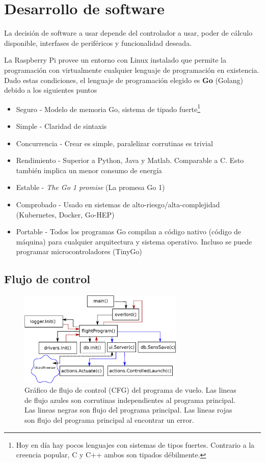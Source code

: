 \section{Desarrollo de software}

La decisión de software a usar depende del controlador a usar, poder de cálculo disponible, interfases de periféricos y funcionalidad deseada.

\medskip

La Raspberry Pi provee un entorno con Linux instalado que permite la programación con virtualmente cualquier lenguaje de programación en existencia. Dado estas condiciones, el lenguaje de programación elegido es \textbf{Go} (Golang) debido a los siguientes puntos

\begin{itemize}
    \item Seguro - Modelo de memoria Go, sistema de tipado fuerte\footnote{Hoy en día hay pocos lenguajes con sistemas de tipos fuertes. Contrario a la creencia popular, C y C++ ambos son tipados débilmente.}
    \item Simple - Claridad de sintaxis
    \item Concurrencia - Crear  es simple, paralelizar corrutinas es trivial
    \item Rendimiento - Superior a Python, Java y Matlab. Comparable a C. Esto también implica un menor consumo de energía
    \item Estable - \textit{The Go 1 promise} (La promesa Go 1)
    \item Comprobado -  Usado en sistemas de alto-riesgo/alta-complejidad (Kubernetes, Docker, Go-HEP)
    \item Portable - Todos los programas Go compilan a código nativo (código de máquina) para cualquier arquitectura y sistema operativo. Incluso se puede programar microcontroladores (TinyGo)
\end{itemize}


\newpage

\subsection{Flujo de control}
\begin{figure}[!htb]
    \centering
    \includegraphics[width=0.7\textwidth]{fig/cfg_flightprogram.eps}
    \caption{Gráfico de flujo de control (CFG) del programa de vuelo. Las lineas de flujo azules son corrutinas independientes al programa principal. Las lineas negras son flujo del programa principal. Las lineas rojas son flujo del programa principal al encontrar un error.}
    \label{fig:flightProgram}
\end{figure}

